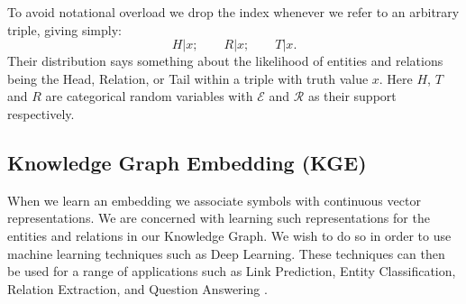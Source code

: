 To avoid notational overload we drop the index whenever we refer to an arbitrary triple, giving simply:
\begin{equation} \label{eq:ex_cond_rv2}
    H | x; \hspace{2em} R | x; \hspace{2em} T | x .
\end{equation}
Their distribution says something about the likelihood of entities and relations being the Head, Relation, or Tail within a triple with truth value $x$. 
Here $H$, $T$ and $R$ are categorical random variables with $\mathcal{E}$ and $\mathcal{R}$ as their support respectively. 



\subsection*{Knowledge Graph Embedding (KGE)}
% 

When we learn an embedding we associate symbols with continuous vector representations. We are concerned with learning such representations for the entities and relations in our Knowledge Graph. We wish to do so in order to use machine learning techniques such as Deep Learning. These techniques can then be used for a range of applications such as Link Prediction, Entity Classification, Relation Extraction, and Question Answering .

